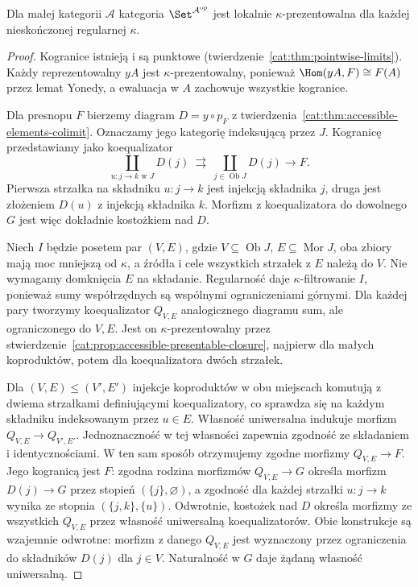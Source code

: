 \begin{twierdzenie}\label{cat:thm:accessible-presheaf-local}
Dla małej kategorii $\mathcal A$ kategoria $\Set^{\mathcal A^{\mathrm{op}}}$ jest lokalnie $\kappa$-prezentowalna dla każdej nieskończonej regularnej $\kappa$.
\end{twierdzenie}
\begin{proof}
Kogranice istnieją i są punktowe (twierdzenie~\ref{cat:thm:pointwise-limits}). Każdy reprezentowalny $yA$ jest $\kappa$-prezentowalny, ponieważ $\Hom(yA,F)\cong F(A)$ przez lemat Yonedy, a ewaluacja w $A$ zachowuje wszystkie kogranice.

Dla presnopu $F$ bierzemy diagram $D=y\circ p_F$ z twierdzenia~\ref{cat:thm:accessible-elements-colimit}. Oznaczamy jego kategorię indeksującą przez $J$. Kogranicę przedstawiamy jako koequalizator
\[
 \coprod_{u:j\to k\text{ w }J}D(j)
 \ \rightrightarrows\
 \coprod_{j\in\operatorname{Ob}J}D(j)
 \longrightarrow F.
\]
Pierwsza strzałka na składniku $u:j\to k$ jest injekcją składnika $j$, druga jest złożeniem $D(u)$ z injekcją składnika $k$. Morfizm z koequalizatora do dowolnego $G$ jest więc dokładnie kostożkiem nad $D$.

Niech $I$ będzie posetem par $(V,E)$, gdzie $V\subseteq\operatorname{Ob}J$, $E\subseteq\operatorname{Mor}J$, oba zbiory mają moc mniejszą od $\kappa$, a źródła i cele wszystkich strzałek z $E$ należą do $V$. Nie wymagamy domknięcia $E$ na składanie. Regularność daje $\kappa$-filtrowanie $I$, ponieważ sumy współrzędnych są wspólnymi ograniczeniami górnymi. Dla każdej pary tworzymy koequalizator $Q_{V,E}$ analogicznego diagramu sum, ale ograniczonego do $V,E$. Jest on $\kappa$-prezentowalny przez stwierdzenie~\ref{cat:prop:accessible-presentable-closure}, najpierw dla małych koproduktów, potem dla koequalizatora dwóch strzałek.

Dla $(V,E)\leq(V',E')$ injekcje koproduktów w obu miejscach komutują z dwiema strzałkami definiującymi koequalizatory, co sprawdza się na każdym składniku indeksowanym przez $u\in E$. Własność uniwersalna indukuje morfizm $Q_{V,E}\to Q_{V',E'}$. Jednoznaczność w tej własności zapewnia zgodność ze składaniem i identycznościami. W ten sam sposób otrzymujemy zgodne morfizmy $Q_{V,E}\to F$. Jego kogranicą jest $F$: zgodna rodzina morfizmów $Q_{V,E}\to G$ określa morfizm $D(j)\to G$ przez stopień $(\{j\},\varnothing)$, a zgodność dla każdej strzałki $u:j\to k$ wynika ze stopnia $(\{j,k\},\{u\})$. Odwrotnie, kostożek nad $D$ określa morfizmy ze wszystkich $Q_{V,E}$ przez własność uniwersalną koequalizatorów. Obie konstrukcje są wzajemnie odwrotne: morfizm z danego $Q_{V,E}$ jest wyznaczony przez ograniczenia do składników $D(j)$ dla $j\in V$. Naturalność w $G$ daje żądaną własność uniwersalną.


\end{proof}

